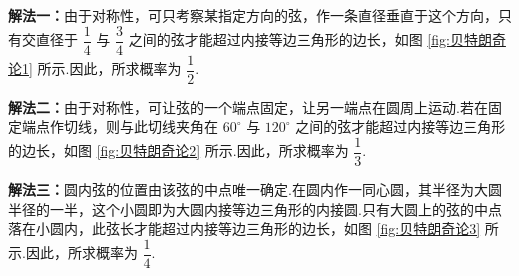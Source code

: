 \begin{solution}

    \textbf{解法一：}由于对称性，可只考察某指定方向的弦，作一条直径垂直于这个方向，只有交直径于 $\dfrac{1}{4}$ 与 $\dfrac{3}{4}$ 之间的弦才能超过内接等边三角形的边长，如图 \ref{fig:贝特朗奇论1} 所示.因此，所求概率为 $\dfrac{1}{2}$.

    \vspace{0.5em}

    \textbf{解法二：}由于对称性，可让弦的一个端点固定，让另一端点在圆周上运动.若在固定端点作切线，则与此切线夹角在 $60^{\circ}$ 与 $120^{\circ}$ 之间的弦才能超过内接等边三角形的边长，如图 \ref{fig:贝特朗奇论2} 所示.因此，所求概率为 $\dfrac{1}{3}$.

    \vspace{0.5em}

    \textbf{解法三：}圆内弦的位置由该弦的中点唯一确定.在圆内作一同心圆，其半径为大圆半径的一半，这个小圆即为大圆内接等边三角形的内接圆.只有大圆上的弦的中点落在小圆内，此弦长才能超过内接等边三角形的边长，如图 \ref{fig:贝特朗奇论3} 所示.因此，所求概率为 $\dfrac{1}{4}$.

    \begin{figure}[H]
        \centering


\end{figure}
\end{solution}
